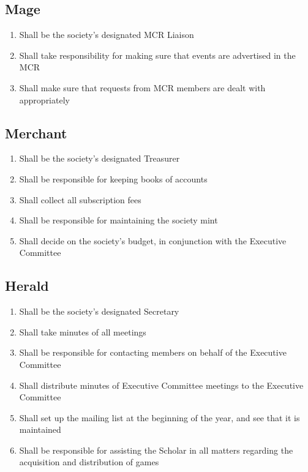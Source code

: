 \documentclass[hidelinks, 12pt, a4paper]{article}
\begin{document}
\subsection{Mage}
\begin{enumerate}
	\item Shall be the society’s designated MCR Liaison
	\item Shall take responsibility for making sure that events are advertised in the MCR
	\item Shall make sure that requests from MCR members are dealt with appropriately
\end{enumerate}

\subsection{Merchant}
\begin{enumerate}
	\item Shall be the society’s designated Treasurer
	\item Shall be responsible for keeping books of accounts
	\item Shall collect all subscription fees
	\item Shall be responsible for maintaining the society mint
	\item Shall decide on the society’s budget, in conjunction with the Executive Committee
\end{enumerate}

\subsection{Herald}
\begin{enumerate}
	\item Shall be the society’s designated Secretary
	\item Shall take minutes of all meetings
	\item Shall be responsible for contacting members on behalf of the Executive Committee
	\item Shall distribute minutes of Executive Committee meetings to the Executive Committee
	\item Shall set up the mailing list at the beginning of the year, and see that it is maintained
	\item Shall be responsible for assisting the Scholar in all matters regarding the acquisition and distribution of games
\end{enumerate}
\end{document}
